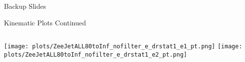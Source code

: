 \documentclass{beamer}
\begin{document}

\begin{frame}{}
  \huge{ Backup Slides }
\end{frame}


\begin{frame}{Kinematic Plots Continued}
  \begin{columns}

    \begin{column}{0.6\textwidth}
      \texttt{[image: plots/ZeeJetALL80toInf\_nofilter\_e\_drstat1\_e1\_pt.png]}
      \vspace{-0.2cm}
      \texttt{[image: plots/ZeeJetALL80toInf\_nofilter\_e\_drstat1\_e2\_pt.png]}
    \end{column}
  \end{columns}
\end{frame}
\end{document}
